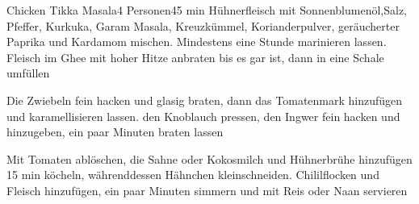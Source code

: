 
\begin{recipe}{Chicken Tikka Masala}{4 Personen}{45 min}
Hühnerfleisch mit Sonnenblumenöl,Salz, Pfeffer, Kurkuka, Garam Masala, Kreuzkümmel, Korianderpulver, geräucherter Paprika und Kardamom mischen. Mindestens eine Stunde marinieren lassen.  Fleisch im Ghee mit hoher Hitze anbraten bis es gar ist, dann in eine Schale umfüllen

Die Zwiebeln fein hacken und glasig braten, dann das Tomatenmark hinzufügen und karamellisieren lassen. den Knoblauch pressen, den Ingwer fein hacken und hinzugeben, ein paar Minuten braten lassen

Mit Tomaten ablöschen, die Sahne oder Kokosmilch und Hühnerbrühe hinzufügen
15 min köcheln, währenddessen Hähnchen kleinschneiden.
Chililflocken und Fleisch hinzufügen, ein paar Minuten simmern und mit Reis oder Naan servieren
\end{recipe}


